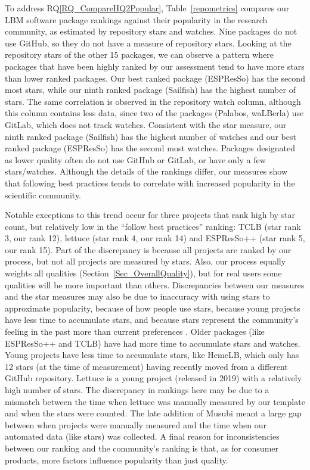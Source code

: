 \documentclass[final, 3p, times, authoryear]{elsarticle}
\newcommand{\rqref}[1]{RQ\ref{#1}}
\begin{document}
To address \rqref{RQ_CompareHQ2Popular}, Table~\ref{repometrics} compares our
LBM software package rankings against their popularity in the research
community, as estimated by repository stars and watches. Nine packages do not
use GitHub, so they do not have a measure of repository stars. Looking at the
repository stars of the other 15 packages, we can observe a pattern where
packages that have been highly ranked by our assessment tend to have more stars
than lower ranked packages. Our best ranked package (ESPResSo) has the second
most stars, while our ninth ranked package (Sailfish) has the highest number of
stars. The same correlation is observed in the repository watch column, although
this column contains less data, since two of the packages (Palabos, waLBerla)
use GitLab, which does not track watches. Consistent with the star measure, our
ninth ranked package (Sailfish) has the highest number of watches and our best
ranked package (ESPResSo) has the second most watches. Packages designated as
lower quality often do not use GitHub or GitLab, or have only a few
stars/watches. Although the details of the rankings differ, our measures show
that following best practices tends to correlate with increased popularity in
the scientific community.

Notable exceptions to this trend occur for three projects that rank high by star
count, but relatively low in the ``follow best practices'' ranking: TCLB (star
rank 3, our rank 12), lettuce (star rank 4, our rank 14) and ESPResSo++ (star
rank 5, our rank 15).  Part of the discrepancy is because all projects are
ranked by our process, but not all projects are measured by stars.  Also, our
process equally weights all qualities (Section~\ref{Sec_OverallQuality}), but
for real users some qualities will be more important than others. Discrepancies
between our measures and the star measures may also be due to inaccuracy with
using stars to approximate popularity, because of how people use stars, because
young projects have less time to accumulate stars, and because stars represent
the community's feeling in the past more than current preferences
\citep{Szulik2017}. Older packages (like ESPResSo++ and TCLB) have had more time
to accumulate stars and watches. Young projects have less time to accumulate
stars, like HemeLB, which only has 12 stars (at the time of measurement) having
recently moved from a different GitHub repository.  Lettuce is a young project
(released in 2019) with a relatively high number of stars. The discrepancy in
rankings here may be due to a mismatch between the time when lettuce was
manually measured by our template and when the stars were counted. The late
addition of Musubi meant a large gap between when projects were manually
measured and the time when our automated data (like stars) was collected. A
final reason for inconsistencies between our ranking and the community's ranking
is that, as for consumer products, more factors influence popularity than just
quality.
\end{document}
